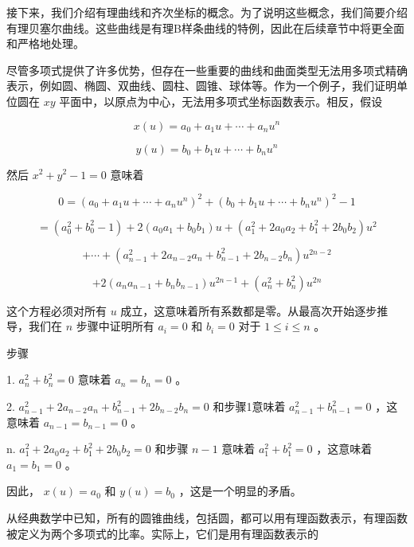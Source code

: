 \documentclass[../main.tex]{subfiles}
\begin{document}
接下来，我们介绍有理曲线和齐次坐标的概念。为了说明这些概念，我们简要介绍有理贝塞尔曲线。这些曲线是有理B样条曲线的特例，因此在后续章节中将更全面和严格地处理。

尽管多项式提供了许多优势，但存在一些重要的曲线和曲面类型无法用多项式精确表示，例如圆、椭圆、双曲线、圆柱、圆锥、球体等。作为一个例子，我们证明单位圆在 \({xy}\) 平面中，以原点为中心，无法用多项式坐标函数表示。相反，假设

\[
x\left( u\right)  = {a}_{0} + {a}_{1}u + \cdots  + {a}_{n}{u}^{n}
\]

\[
y\left( u\right)  = {b}_{0} + {b}_{1}u + \cdots  + {b}_{n}{u}^{n}
\]

然后 \({x}^{2} + {y}^{2} - 1 = 0\) 意味着

\[
0 = {\left( {a}_{0} + {a}_{1}u + \cdots  + {a}_{n}{u}^{n}\right) }^{2} + {\left( {b}_{0} + {b}_{1}u + \cdots  + {b}_{n}{u}^{n}\right) }^{2} - 1
\]

\[
= \left( {{a}_{0}^{2} + {b}_{0}^{2} - 1}\right)  + 2\left( {{a}_{0}{a}_{1} + {b}_{0}{b}_{1}}\right) u + \left( {{a}_{1}^{2} + 2{a}_{0}{a}_{2} + {b}_{1}^{2} + 2{b}_{0}{b}_{2}}\right) {u}^{2}
\]

\[
+ \cdots  + \left( {{a}_{n - 1}^{2} + 2{a}_{n - 2}{a}_{n} + {b}_{n - 1}^{2} + 2{b}_{n - 2}{b}_{n}}\right) {u}^{{2n} - 2}
\]

\[
+ 2\left( {{a}_{n}{a}_{n - 1} + {b}_{n}{b}_{n - 1}}\right) {u}^{{2n} - 1} + \left( {{a}_{n}^{2} + {b}_{n}^{2}}\right) {u}^{2n}
\]

这个方程必须对所有 \(u\) 成立，这意味着所有系数都是零。从最高次开始逐步推导，我们在 \(n\) 步骤中证明所有 \({a}_{i} = 0\) 和 \({b}_{i} = 0\) 对于 \(1 \leq  i \leq  n\) 。

步骤

1. \({a}_{n}^{2} + {b}_{n}^{2} = 0\) 意味着 \({a}_{n} = {b}_{n} = 0\) 。

2. \({a}_{n - 1}^{2} + 2{a}_{n - 2}{a}_{n} + {b}_{n - 1}^{2} + 2{b}_{n - 2}{b}_{n} = 0\) 和步骤1意味着 \({a}_{n - 1}^{2} + {b}_{n - 1}^{2} = 0\) ，这意味着 \({a}_{n - 1} = {b}_{n - 1} = 0\) 。

n. \({a}_{1}^{2} + 2{a}_{0}{a}_{2} + {b}_{1}^{2} + 2{b}_{0}{b}_{2} = 0\) 和步骤 \(n - 1\) 意味着 \({a}_{1}^{2} + {b}_{1}^{2} = 0\) ，这意味着 \({a}_{1} = {b}_{1} = 0\) 。

因此， \(x\left( u\right)  = {a}_{0}\) 和 \(y\left( u\right)  = {b}_{0}\) ，这是一个明显的矛盾。

从经典数学中已知，所有的圆锥曲线，包括圆，都可以用有理函数表示，有理函数被定义为两个多项式的比率。实际上，它们是用有理函数表示的
\end{document}
